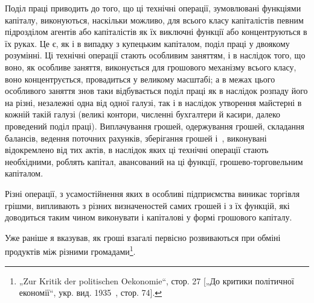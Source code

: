 Поділ праці приводить до того, що ці технічні операції, зумовлювані
функціями капіталу, виконуються, наскільки можливо,
для всього класу капіталістів певним підрозділом агентів або
капіталістів як їх виключні функції або концентруються в їх
руках. Це є, як і в випадку з купецьким капіталом, поділ праці
у двоякому розумінні. Ці технічні операції стають особливим заняттям,
і в наслідок того, що воно, як особливе заняття, виконується
для грошового механізму всього класу, воно концентрується, провадиться
у великому масштабі; а в межах цього особливого заняття
знов таки відбувається поділ праці як в наслідок розпаду його
на різні, незалежні одна від одної галузі, так і в наслідок утворення
майстерні в кожній такій галузі (великі контори, численні
бухгалтери й касири, далеко проведений поділ праці).
Виплачування грошей, одержування грошей, складання балансів,
ведення поточних рахунків, зберігання грошей і~, виконувані
відокремлено від тих актів, в наслідок яких ці технічні операції
стають необхідними, роблять капітал, авансований на ці
функції, грошево-торговельним капіталом.

Різні операції, з усамостійнення яких в особливі підприємства
виникає торгівля грішми, випливають з різних визначеностей
самих грошей і з їх функцій, які доводиться таким чином виконувати
і капіталові у формі грошового капіталу.

Уже раніше я вказував, як гроші взагалі первісно розвиваються
при обміні продуктів між різними громадами\footnote{
„Zur Kritik der politischen Oekonomie“, стор. 27 [„До критики політичної
економії“, укр. вид. 1935~, стор. 74].
}.

